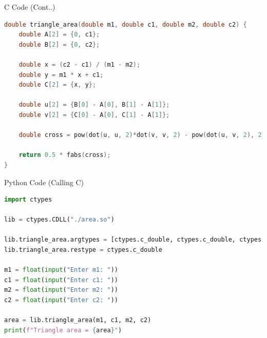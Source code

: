 \documentclass{beamer}
\begin{document}
\begin{frame}[fragile]{C Code (Cont..)}
\begin{lstlisting}[language=C]
double triangle_area(double m1, double c1, double m2, double c2) {
    double A[2] = {0, c1};
    double B[2] = {0, c2};
    
    double x = (c2 - c1) / (m1 - m2);
    double y = m1 * x + c1;
    double C[2] = {x, y};
    
    double u[2] = {B[0] - A[0], B[1] - A[1]};
    double v[2] = {C[0] - A[0], C[1] - A[1]};
    
    double cross = pow(dot(u, u, 2)*dot(v, v, 2) - pow(dot(u, v, 2), 2), 0.5);
    
    return 0.5 * fabs(cross);
}
\end{lstlisting}
\end{frame}


\begin{frame}[fragile]{Python Code (Calling C)}
\begin{lstlisting}[language=Python]
import ctypes

lib = ctypes.CDLL("./area.so")

lib.triangle_area.argtypes = [ctypes.c_double, ctypes.c_double, ctypes.c_double, ctypes.c_double]
lib.triangle_area.restype = ctypes.c_double

m1 = float(input("Enter m1: "))
c1 = float(input("Enter c1: "))
m2 = float(input("Enter m2: "))
c2 = float(input("Enter c2: "))

area = lib.triangle_area(m1, c1, m2, c2)
print(f"Triangle area = {area}")
\end{lstlisting}
\end{frame}
\end{document}

